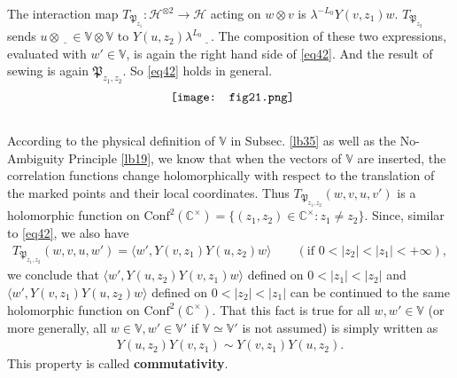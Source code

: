 \documentclass[12pt,a4paper,notitlepage]{article}
\theoremstyle{definition}
\theoremstyle{plain}
\newcommand{\fk}{\mathfrak}
\newcommand{\mc}{\mathcal}
\newcommand{\Conf}{\mathrm{Conf}}
\newcommand{\bk}[1]{\langle {#1}\rangle}
\newcommand{\Vbb}{\mathbb V}
\newcommand{\Cbb}{\mathbb C}
\numberwithin{equation}{section}
\begin{document}
The interaction map $T_{\fk P_{z_1}}:\mc H^{\otimes 2}\rightarrow\mc H$ acting on $w\otimes v$ is $\lambda^{-L_0}Y(v,z_1)w$. $T_{\fk P_{z_2}}$ sends $u\otimes \underline{~~~}\in\Vbb\otimes\Vbb$ to $Y(u,z_2)\lambda^{L_0}\underline{~~~}$. The composition of these two expressions, evaluated with $w'\in\Vbb$, is again the right hand side of \eqref{eq42}. And the result of sewing is again $\fk P_{z_1,z_2}$. So \eqref{eq42} holds in general.
\begin{align*}
	\vcenter{\hbox{{
				\texttt{[image: fig21.png]}}}}
\end{align*}



\subsection{}


According to the physical definition of $\Vbb$ in Subsec. \ref{lb35} as well as the No-Ambiguity Principle \ref{lb19}, we know that when the vectors of $\Vbb$ are inserted, the correlation functions change holomorphically with respect to the translation of the marked points and their local coordinates. Thus $T_{\fk P_{z_1,z_2}}(w,v,u,v')$ is a holomorphic function on $\Conf^2(\Cbb^\times)=\{(z_1,z_2)\in\Cbb^\times:z_1\neq z_2\}$. Since, similar to \eqref{eq42}, we also have
\begin{align}
	T_{\fk P_{z_1,z_2}}(w,v,u,w')=\bk{w',Y(v,z_1)Y(u,z_2)w}\qquad(\text{if }0<|z_2|<|z_1|<+\infty),\label{eq44}	
\end{align}
we conclude that $\bk{w',Y(u,z_2)Y(v,z_1)w}$ defined on $0<|z_1|<|z_2|$ and $\bk{w',Y(v,z_1)Y(u,z_2)w}$ defined on $0<|z_2|<|z_1|$ can be continued to the same holomorphic function on $\Conf^2(\Cbb^\times)$. That this fact is true for all $w,w'\in\Vbb$ (or more generally, all $w\in\Vbb,w'\in\Vbb'$ if $\Vbb\simeq\Vbb'$ is not assumed) is simply written as
\begin{align}
Y(u,z_2)Y(v,z_1)\sim Y(v,z_1)Y(u,z_2).	
\end{align}
This property is called \textbf{commutativity}.
\end{document}
